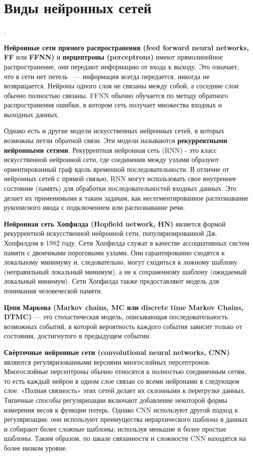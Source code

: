 \section{Виды нейронных сетей}.

 \textbf{Нейронные сети прямого распространения 
(feed forward neural networks, FF} или \textbf{FFNN)} и 
\textbf{перцептроны (perceptrons)} имеют прямолинейное распространение, они передают информацию от входа к выходу. Это означает, что в сети нет петель ~--- информация всегда передается, никогда не возвращается. Нейроны одного слоя не связаны между собой, а соседние слои обычно полностью связаны. FFNN обычно обучается по методу обратного распространения ошибки, в котором сеть получает множества входных и выходных данных.

Однако есть и другие модели искусственных нейронных сетей, в которых возможны петли обратной связи. Эти модели называются \textbf{рекуррентными нейронными сетями}. Рекуррентная нейронная сеть (RNN) - это класс искусственной нейронной сети, где соединения между узлами образуют ориентированный граф вдоль временной последовательности. В отличие от нейронных сетей с прямой связью, RNN могут использовать свое внутреннее состояние (память) для обработки последовательностей входных данных. Это делает их применимыми к таким задачам, как несегментированное распознавание рукописного ввода с подключением или распознавание речи.

\textbf{Нейронная сеть Хопфилда (Hopfield network, HN)} является формой рекуррентной искусственной нейронной сети, популяризированной Дж. Хопфилдом в 1982 году. Сети Хопфилда служат в качестве ассоциативных систем памяти с двоичными пороговыми узлами. Они гарантированно сходятся к локальному минимуму и, следовательно, могут сходиться к ложному шаблону (неправильный локальный минимум), а не к сохраненному шаблону (ожидаемый локальный минимум). Сети Хопфилда также предоставляют модель для понимания человеческой памяти.

\textbf{Цепи Маркова (Markov chains, MC или discrete time Markov Chains, DTMC)} — это стохастическая модель, описывающая последовательность возможных событий, в которой вероятность каждого события зависит только от состояния, достигнутого в предыдущем событии.

\textbf{Свёрточные нейронные сети (convolutional neural networks, CNN)} являются регуляризованными версиями многослойных персептронов. Многослойные персептроны обычно относятся к полностью соединенным сетям, то есть каждый нейрон в одном слое связан со всеми нейронами в следующем слое. «Полная связность» этих сетей делает их склонными к перегрузке данных. Типичные способы регуляризации включают добавление некоторой формы измерения весов к функции потерь. Однако CNN используют другой подход к регуляризации: они используют преимущества иерархического шаблона в данных и собирают более сложные шаблоны, используя меньшие и более простые шаблоны. Таким образом, по шкале связанности и сложности CNN находятся на более низком уровне.
